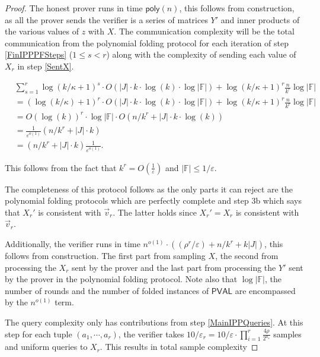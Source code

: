 \documentclass[10pt,a4paper]{article}
\newcommand{\poly}{\mathsf{poly}}
\newcommand{\PVAL}{\mathsf{PVAL}}
\newcommand{\F}{\mathbb{F}}
\begin{document}
\begin{proof}
 The honest prover runs in time $\poly(n)$, this follows from construction, as all the prover sends the verifier is a series of matrices $Y'$ and inner products of the various values of $z$ with $X$. The communication complexity will be the total communication from the polynomial folding protocol for each iteration of step \ref{FinIPPPFSteps} ($1\leq s<r$) along with the complexity of sending each value of $X_{r}$ in step \ref{SentX}.

\[
\begin{split}
    &\sum_{s=1}^{r}\log(k/\kappa+1)^{s}\cdot O(|J|\cdot k\cdot\log (k)\cdot \log \vert \F \vert)+\log(k/\kappa+1)^{r}\frac{n}{k^{r}}\log |\F|\\
    &=(\log(k/\kappa)+1)^{r}\cdot O(|J|\cdot k\cdot\log (k)\cdot \log \vert \F \vert)+\log(k/\kappa+1)^{r}\frac{n}{k^{r}}\log |\F|\\
    &=O(\log(k))^{r} \cdot \log \vert \F \vert \cdot O(n/k^{r}+|J|\cdot k\cdot \log (k))\\
    &=\frac{1}{\varepsilon^{o(1)}}(n/k^{r}+|J|\cdot k)\\
    &=(n/k^{r}+|J|\cdot k)\frac{1}{\varepsilon^{o(1)}}.
\end{split}
\]

\noindent This follows from the fact that $k^{r}=O\left(\frac{1}{\varepsilon}\right)$ and $|\F|\leq 1/\varepsilon$.

The completeness of this protocol follows as the only parts it can reject are the polynomial folding protocols which are perfectly complete and step 3b which says that $X_{r}'$ is consistent with $\vec{v}_{r}$. The latter holds since $X_{r}'=X_{r}$ is consistent with $\vec{v}_{r}$. 

Additionally, the verifier runs in time $n^{o(1)} \cdot ((\rho^{r}/\varepsilon) + n/k^{r} + k\vert J\vert)$, this follows from construction. The first part from sampling $X$, the second from processing the $X_{r}$ sent by the prover and the last part from processing the $Y'$ sent by the prover in the polynomial folding protocol. Note also that $\log |\F|$, the number of rounds and the number of folded instances of $\PVAL$ are encompassed by the $n^{o(1)}$ term.

The query complexity only has contributions from step \ref{MainIPPQueries}. At this step for each tuple $(a_{1},\cdots,a_{r})$, the verifier takes $10/\varepsilon_{r}=10/\varepsilon \cdot \prod_{i=1}^r \frac{4\rho}{2^{a_{s}}}$ samples and uniform queries to $X_{r}$. This results in total sample complexity


\end{proof}
\end{document}
